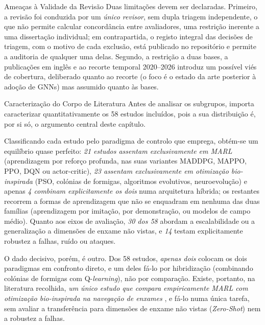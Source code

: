 \documentclass[12pt,reqno, twoside]{amsbook}
\makeatletter
\def\section{\@startsection{section}{1}%
      \z@{.5\linespacing\@plus.7\linespacing}{.25\linespacing}%
      {\normalfont\bfseries\flushleft}}
\def\subsection{\@startsection{subsection}{2}%
      \z@{.5\linespacing\@plus.7\linespacing}{.25\linespacing}%
      {\normalfont\bfseries\flushleft}}
\theoremstyle{plain}
\numberwithin{equation}{chapter}
\numberwithin{section}{chapter}
\numberwithin{table}{chapter}
\numberwithin{figure}{chapter}
\makeatother
\begin{document}
\subsection{Ameaças à Validade da Revisão}
Duas limitações devem ser declaradas. Primeiro, a revisão foi conduzida por um \emph{único revisor}, sem dupla triagem independente, o que não permite calcular concordância entre avaliadores, uma restrição inerente a uma dissertação individual; em contrapartida, o registo integral das decisões de triagem, com o motivo de cada exclusão, está publicado no repositório e permite a auditoria de qualquer uma delas. Segundo, a restrição a duas bases, a publicações em inglês e ao recorte temporal 2020--2026 introduz um possível viés de cobertura, deliberado quanto ao recorte (o foco é o estado da arte posterior à adoção de GNNs) mas assumido quanto às bases.



\section{Caracterização do Corpo de Literatura}
\label{sec:slr_caracterizacao}
Antes de analisar os subgrupos, importa caracterizar quantitativamente os 58 estudos incluídos, pois a sua distribuição é, por si só, o argumento central deste capítulo.

Classificando cada estudo pelo paradigma de controlo que emprega, obtém-se um equilíbrio quase perfeito: \emph{21 estudos assentam exclusivamente em MARL} (aprendizagem por reforço profunda, nas suas variantes MADDPG, MAPPO, PPO, DQN ou actor-critic), \emph{23 assentam exclusivamente em otimização bio-inspirada} (PSO, colónias de formigas, algoritmos evolutivos, neuroevolução) e apenas \emph{4 combinam explicitamente os dois} numa arquitetura híbrida; os restantes recorrem a formas de aprendizagem que não se enquadram em nenhuma das duas famílias (aprendizagem por imitação, por demonstração, ou modelos de campo médio). Quanto aos eixos de avaliação, \emph{30 dos 58} abordam a escalabilidade ou a generalização a dimensões de enxame não vistas, e \emph{14} testam explicitamente robustez a falhas, ruído ou ataques.

O dado decisivo, porém, é outro. Dos 58 estudos, \emph{apenas dois} colocam os dois paradigmas em confronto direto, e um deles fá-lo por hibridização (combinando colónias de formigas com Q-\textit{learning}), não por comparação. Existe, portanto, na literatura recolhida, \emph{um único estudo que compara empiricamente MARL com otimização bio-inspirada na navegação de enxames} \cite{iskandar2024comparative}, e fá-lo numa única tarefa, sem avaliar a transferência para dimensões de enxame não vistas (\textit{Zero-Shot}) nem a robustez a falhas.
\end{document}
